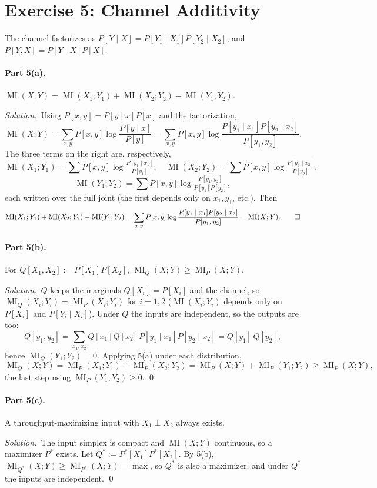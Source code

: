 \documentclass[11pt]{article}
\DeclareMathOperator{\MI}{MI}
\theoremstyle{plain}
\newcommand{\soln}{\medskip\noindent\textit{Solution.}\ }
\begin{document}
\section{Exercise 5: Channel Additivity}

The channel factorizes as $P[Y\mid X]=P[Y_1\mid X_1]P[Y_2\mid X_2]$, and $P[Y,X]=P[Y\mid X]P[X]$.

\paragraph{Part 5(a).} $\MI(X;Y)=\MI(X_1;Y_1)+\MI(X_2;Y_2)-\MI(Y_1;Y_2)$.

\soln Using $P[x,y]=P[y\mid x]P[x]$ and the factorization,
\[
  \MI(X;Y)=\sum_{x,y}P[x,y]\log\frac{P[y\mid x]}{P[y]}
  =\sum_{x,y}P[x,y]\log\frac{P[y_1\mid x_1]P[y_2\mid x_2]}{P[y_1,y_2]}.
\]
The three terms on the right are, respectively,
\[
  \MI(X_1;Y_1)=\sum P[x,y]\log\tfrac{P[y_1\mid x_1]}{P[y_1]},\quad
  \MI(X_2;Y_2)=\sum P[x,y]\log\tfrac{P[y_2\mid x_2]}{P[y_2]},
\]
\[
  \MI(Y_1;Y_2)=\sum P[x,y]\log\tfrac{P[y_1,y_2]}{P[y_1]P[y_2]},
\]
each written over the full joint (the first depends only on $x_1,y_1$, etc.). Then
\[
  \MI(X_1;Y_1)+\MI(X_2;Y_2)-\MI(Y_1;Y_2)
  =\sum_{x,y}P[x,y]\log\frac{P[y_1\mid x_1]P[y_2\mid x_2]}{P[y_1,y_2]}=\MI(X;Y). \qed
\]

\paragraph{Part 5(b).} For $Q[X_1,X_2]:=P[X_1]P[X_2]$, $\MI_Q(X;Y)\ge\MI_P(X;Y)$.

\soln $Q$ keeps the marginals $Q[X_i]=P[X_i]$ and the channel, so $\MI_Q(X_i;Y_i)=\MI_P(X_i;Y_i)$ for $i=1,2$ ($\MI(X_i;Y_i)$ depends only on $P[X_i]$ and $P[Y_i\mid X_i]$). Under $Q$ the inputs are independent, so the outputs are too:
\[
  Q[y_1,y_2]=\sum_{x_1,x_2}Q[x_1]Q[x_2]P[y_1\mid x_1]P[y_2\mid x_2]=Q[y_1]\,Q[y_2],
\]
hence $\MI_Q(Y_1;Y_2)=0$. Applying 5(a) under each distribution,
\[
  \MI_Q(X;Y)=\MI_P(X_1;Y_1)+\MI_P(X_2;Y_2)
  =\MI_P(X;Y)+\MI_P(Y_1;Y_2)\ge\MI_P(X;Y),
\]
the last step using $\MI_P(Y_1;Y_2)\ge0$. \qed

\paragraph{Part 5(c).} A throughput-maximizing input with $X_1\perp X_2$ always exists.

\soln The input simplex is compact and $\MI(X;Y)$ continuous, so a maximizer $P^*$ exists. Let $Q^*:=P^*[X_1]P^*[X_2]$. By 5(b), $\MI_{Q^*}(X;Y)\ge\MI_{P^*}(X;Y)=\max$, so $Q^*$ is also a maximizer, and under $Q^*$ the inputs are independent. \qed
\end{document}
